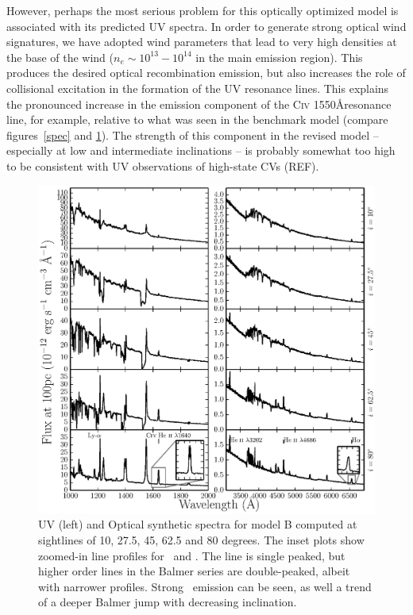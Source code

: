 \documentclass[preprint, a4paper, 11pt]{aastex}
\begin{document}
However, perhaps the most serious problem for this optically optimized
model is associated with its predicted UV spectra. In order to
generate strong optical wind signatures, we have adopted wind
parameters that lead to very high densities at the base of the wind
($n_e\sim10^{13}-10^{14}$ in the main emission region). This produces
the desired optical recombination emission, but also increases the
role of collisional excitation in the formation of the UV resonance
lines. This explains the pronounced increase in the emission component 
of the C\textsc{iv} 1550\AA resonance line, for example, relative to
what was seen in the benchmark model (compare figures~\ref{spec} and
\ref{uvoptb}). The strength of this component in the revised model --
especially at low and intermediate inclinations -- is probably
somewhat too high to be consistent with UV observations of high-state
CVs (REF).

\begin{figure} %
\includegraphics[width=\textwidth]{figures/fig14_uv_opt.eps}
\caption{
UV (left) and Optical synthetic spectra for model B computed at
sightlines of 10, 27.5, 45, 62.5 and 80 degrees.	
The inset plots show zoomed-in line profiles for 
\heiiuv\ and \ha. The \ha line 
is single peaked, but higher order lines in the Balmer series
are double-peaked, albeit with narrower profiles.
Strong \heiiopt\ emission can be seen, as well a trend
of a deeper Balmer jump with decreasing inclination.
}
\label{uvoptb}
\end{figure} %
\end{document}

